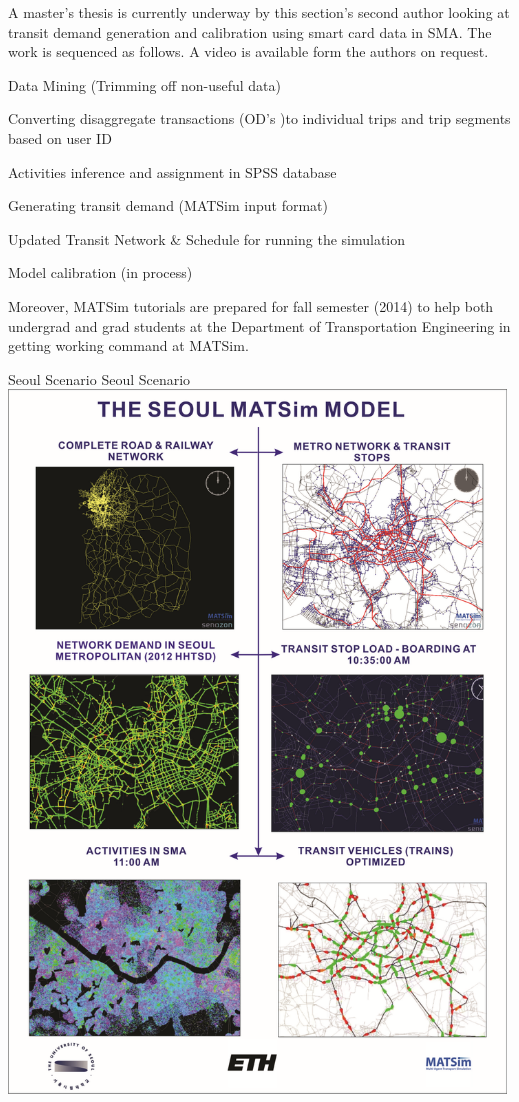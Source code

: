 A master's thesis is currently underway by this section's second author looking at transit demand generation and calibration using smart card data in SMA. The work is sequenced as follows. A video is available form the authors on request.
%
\begin{compactitem}
\item Data Mining (Trimming off non-useful data)
\item	Converting disaggregate transactions (OD’s )to individual trips and trip segments based on user ID
\item	Activities inference and assignment in SPSS database
\item	Generating transit demand (MATSim input format)
\item	Updated Transit Network \& Schedule for running the simulation
\item	Model calibration (in process)
\end{compactitem}
%
Moreover, MATSim tutorials are prepared for fall semester (2014) to help both undergrad and grad students at the Department of Transportation Engineering in getting working command at MATSim.

\createfigure%
{Seoul Scenario}%
{Seoul Scenario}%
{\label{fig:seoul}}%
{\includegraphics[width=0.99\textwidth, angle=0]{using/figures/seoul}}%
{}

 
 